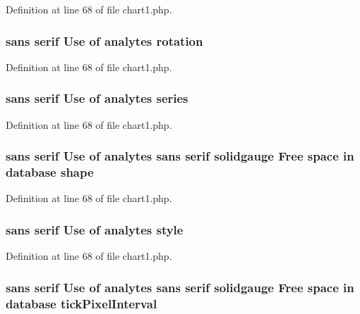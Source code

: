 Definition at line 68 of file chart1.\-php.

\hypertarget{chart1_8php_a389898f41b29820945784f375c8fca58}{
\subsubsection[{rotation}]{ sans serif Use of analytes rotation}}\label{chart1_8php_a389898f41b29820945784f375c8fca58}


Definition at line 68 of file chart1.\-php.

\hypertarget{chart1_8php_aba4b72d8f1b3e6b391ab41ca542f005a}{
\subsubsection[{series}]{ sans serif Use of analytes series}}\label{chart1_8php_aba4b72d8f1b3e6b391ab41ca542f005a}


Definition at line 68 of file chart1.\-php.

\hypertarget{chart1_8php_ae7c4d90f4cb1daf8fe98b42979422af5}{
\subsubsection[{shape}]{ sans serif Use of analytes sans serif solidgauge Free space in database shape}}\label{chart1_8php_ae7c4d90f4cb1daf8fe98b42979422af5}


Definition at line 68 of file chart1.\-php.

\hypertarget{chart1_8php_a1659ed273dcf8f4bf89ff39127637cd1}{
\subsubsection[{style}]{ sans serif Use of analytes style}}\label{chart1_8php_a1659ed273dcf8f4bf89ff39127637cd1}


Definition at line 68 of file chart1.\-php.

\hypertarget{chart1_8php_a024b1caef992f256398e4b6cc5b5d8ae}{
\subsubsection[{tick\-Pixel\-Interval}]{ sans serif Use of analytes sans serif solidgauge Free space in database tick\-Pixel\-Interval}}\label{chart1_8php_a024b1caef992f256398e4b6cc5b5d8ae}


